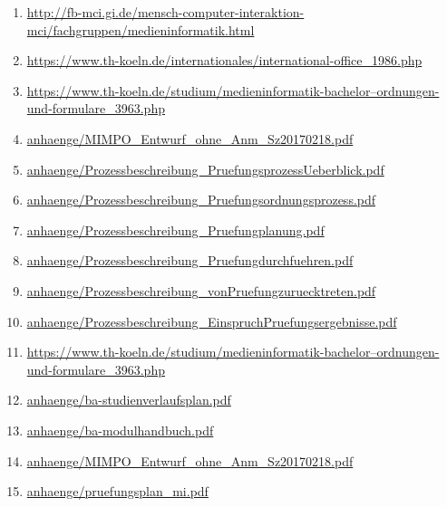 \documentclass[BCOR12mm,DIV11,titlepage,a4paper,oneside,10pt]{scrbook}
\begin{document}
\begin{sloppypar}
\begin{flushleft}
\begin{enumerate}
\item{\href{http://fb-mci.gi.de/mensch-computer-interaktion-mci/fachgruppen/medieninformatik.html}{http://fb-mci.gi.de/mensch-computer-interaktion-mci/fachgruppen/medieninformatik.html} } 
\item{\href{https://www.th-koeln.de/internationales/international-office\_1986.php}{https://www.th-koeln.de/internationales/international-office\_1986.php} } 
\item{\href{https://www.th-koeln.de/studium/medieninformatik-bachelor--ordnungen-und-formulare\_3963.php}{https://www.th-koeln.de/studium/medieninformatik-bachelor--ordnungen-und-formulare\_3963.php} } 
\item{\href{anhaenge/MIMPO\_Entwurf\_ohne\_Anm\_Sz20170218.pdf}{anhaenge/MIMPO\_Entwurf\_ohne\_Anm\_Sz20170218.pdf} } 
\item{\href{anhaenge/Prozessbeschreibung\_PruefungsprozessUeberblick.pdf}{anhaenge/Prozessbeschreibung\_PruefungsprozessUeberblick.pdf} } 
\item{\href{anhaenge/Prozessbeschreibung\_Pruefungsordnungsprozess.pdf}{anhaenge/Prozessbeschreibung\_Pruefungsordnungsprozess.pdf} } 
\item{\href{anhaenge/Prozessbeschreibung\_Pruefungplanung.pdf}{anhaenge/Prozessbeschreibung\_Pruefungplanung.pdf} } 
\item{\href{anhaenge/Prozessbeschreibung\_Pruefungdurchfuehren.pdf}{anhaenge/Prozessbeschreibung\_Pruefungdurchfuehren.pdf} } 
\item{\href{anhaenge/Prozessbeschreibung\_vonPruefungzuruecktreten.pdf}{anhaenge/Prozessbeschreibung\_vonPruefungzuruecktreten.pdf} } 
\item{\href{anhaenge/Prozessbeschreibung\_EinspruchPruefungsergebnisse.pdf}{anhaenge/Prozessbeschreibung\_EinspruchPruefungsergebnisse.pdf} } 
\item{\href{https://www.th-koeln.de/studium/medieninformatik-bachelor--ordnungen-und-formulare\_3963.php}{https://www.th-koeln.de/studium/medieninformatik-bachelor--ordnungen-und-formulare\_3963.php} } 
\item{\href{anhaenge/ba-studienverlaufsplan.pdf}{anhaenge/ba-studienverlaufsplan.pdf} } 
\item{\href{anhaenge/ba-modulhandbuch.pdf}{anhaenge/ba-modulhandbuch.pdf} } 
\item{\href{anhaenge/MIMPO\_Entwurf\_ohne\_Anm\_Sz20170218.pdf}{anhaenge/MIMPO\_Entwurf\_ohne\_Anm\_Sz20170218.pdf} } 
\item{\href{anhaenge/pruefungsplan\_mi.pdf}{anhaenge/pruefungsplan\_mi.pdf} } 

\end{enumerate}
\end{flushleft}
\end{sloppypar}
\end{document}
